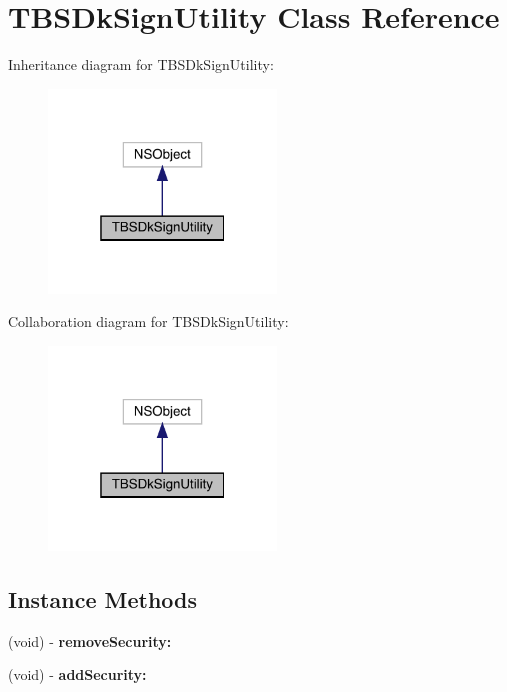 \hypertarget{interface_t_b_s_dk_sign_utility}{}\section{T\+B\+S\+Dk\+Sign\+Utility Class Reference}
\label{interface_t_b_s_dk_sign_utility}


Inheritance diagram for T\+B\+S\+Dk\+Sign\+Utility\+:\nopagebreak
\begin{figure}[H]
\begin{center}
\leavevmode
\includegraphics[width=172pt]{interface_t_b_s_dk_sign_utility__inherit__graph}
\end{center}
\end{figure}


Collaboration diagram for T\+B\+S\+Dk\+Sign\+Utility\+:\nopagebreak
\begin{figure}[H]
\begin{center}
\leavevmode
\includegraphics[width=172pt]{interface_t_b_s_dk_sign_utility__coll__graph}
\end{center}
\end{figure}
\subsection*{Instance Methods}
\begin{DoxyCompactItemize}
\item 
\mbox{\label{interface_t_b_s_dk_sign_utility_a0034635d4902413c96aba1b390831d6c}} 
(void) -\/ {\bfseries remove\+Security\+:}
\item 
\mbox{\label{interface_t_b_s_dk_sign_utility_a3c5dcdd2de1c5110da6644b2aca8d5ed}} 
(void) -\/ {\bfseries add\+Security\+:}
\end{DoxyCompactItemize}

